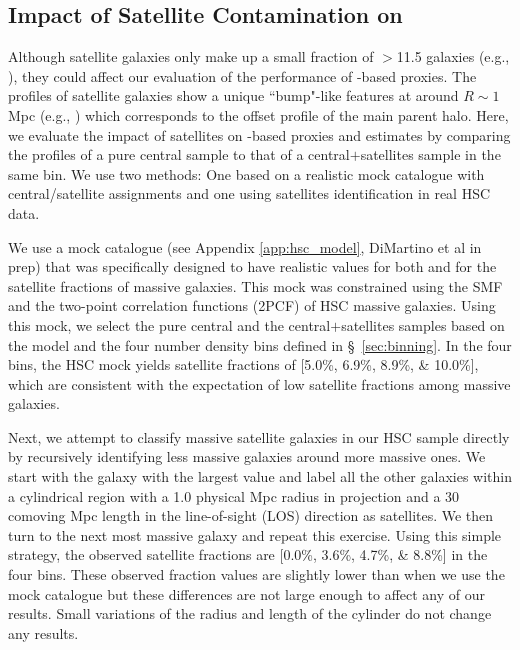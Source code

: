 \documentclass[fleqn,usenatbib,useAMS]{mnras}
\begin{document}
\subsection{Impact of Satellite Contamination on \texorpdfstring{\dsigma{}}{DSigma}}
    \label{sec:satellite}

    Although satellite galaxies only make up a small fraction of $>$11.5 galaxies
    (e.g., \citealt{Reid2014, Saito2016, vanUitert2016, Huang2020}), they could affect our
    evaluation of the performance of \mstar{}-based \mvir{} proxies. 
    The \dsigma{} profiles of satellite galaxies show a unique ``bump"-like features at around $R
    \sim 1$ Mpc (e.g., \citealt{LiShan2014, LiShan2016, Sifon2015, Sifon2018}) which corresponds to
    the offset profile of the main parent halo. 
    Here, we evaluate the impact of satellites on \mstar{}-based proxies and \sigmh{} estimates by
    comparing the \dsigma{} profiles of a pure central sample to that of a central$+$satellites
    sample in the same \topn{} bin. 
    We use two methods: One based on a realistic mock catalogue with central/satellite assignments and
    one using satellites identification in real HSC data.
    
    We use a mock catalogue (see Appendix \ref{app:hsc_model}, DiMartino et al in prep) that was
    specifically designed to have realistic values for both \scatterMhaloObsSym{} and for the
    satellite fractions of massive galaxies. 
    This mock was constrained using the SMF and the two-point correlation functions (2PCF) of HSC
    massive galaxies.
    Using this mock, we select the pure central and the central$+$satellites samples based on 
    the model \mstar{} and the four number density bins defined in \S\ \ref{sec:binning}.
    In the four \topn{} bins, the HSC mock yields satellite fractions of [5.0\%, 6.9\%,
    8.9\%, \& 10.0\%], which are consistent with the expectation of low satellite fractions 
    among massive galaxies.
    
    Next, we attempt to classify massive satellite galaxies in our HSC sample directly by recursively
    identifying less massive galaxies around more massive ones.
    We start with the galaxy with the largest \mstar{} value and label all the other galaxies within
    a cylindrical region with a 1.0 physical Mpc radius in projection and a 30 comoving Mpc length
    in the line-of-sight (LOS) direction as satellites. 
    We then turn to the next most massive galaxy and repeat this exercise. 
    Using this simple strategy, the observed satellite fractions are [0.0\%, 3.6\%, 4.7\%, \& 8.8\%]
    in the four \topn{} bins. 
    These observed fraction values are slightly lower than when we use the mock catalogue but these
    differences are not large enough to affect any of our results. 
    Small variations of the radius and length of the cylinder do not change any results.
\end{document}
